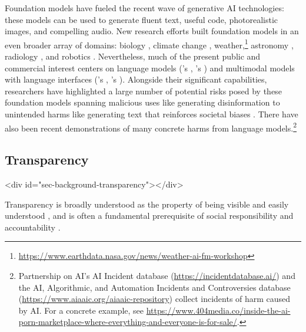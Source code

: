 \documentclass[screen, authorversion, acmsmall]{acmart}
\begin{document}
Foundation models have fueled the recent wave of generative AI technologies: these models can be used to generate fluent text, useful code, photorealistic images, and compelling audio.
New research efforts built foundation models in an even broader array of domains: biology \citep{lin2023evolutionary}, climate change \citep{lacoste2023geobench}, weather,\footnote{\url{https://www.earthdata.nasa.gov/news/weather-ai-fm-workshop}} astronomy \citep{nguyen2023astrollama}, radiology \citep{chambon2022roentgen}, and robotics \citep{openx2023openx}.
Nevertheless, much of the present public and commercial interest centers on language models (\eg \anthropic's \claude, \meta's \llama) and multimodal models with language interfaces (\eg \stability's \stablediffusion, \openai's \gptfour). 
Alongside their significant capabilities, researchers have highlighted a large number of potential risks posed by these foundation models spanning malicious uses like generating disinformation to unintended harms like generating text that reinforces societal biases \citep{bender2021dangers, bommasani2021opportunities, abid2021persistent, weidinger2022taxonomy}.
There have also been recent demonstrations of many concrete harms from language models.\footnote{Partnership on AI's AI Incident database (\url{https://incidentdatabase.ai/}) and the AI, Algorithmic, and Automation Incidents and Controversies database (\url{https://www.aiaaic.org/aiaaic-repository}) collect incidents of harm caused by AI. For a concrete example, see \url{https://www.404media.co/inside-the-ai-porn-marketplace-where-everything-and-everyone-is-for-sale/}.} 

\hypertarget{transparency}{\subsection{Transparency}}
<div id="sec-background-transparency"></div>

Transparency is broadly understood as the property of being visible and easily understood \citep{aristotle350deanima, kalderon2015transparency}, and is often a fundamental prerequisite of social responsibility and accountability \citep{florini2007right,robinson2012nations}.
\end{document}
